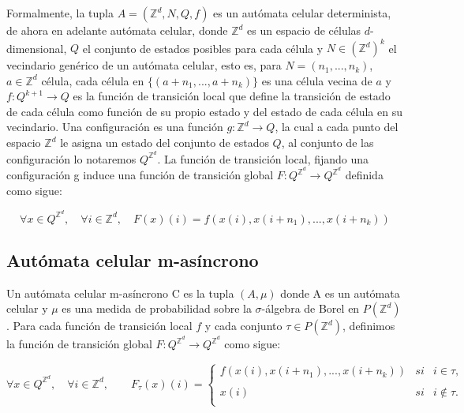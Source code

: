 \documentclass[../proyecto.tex]{memoir}
\begin{document}
Formalmente, la tupla $A=(\mathds{Z}^{d}, N, Q, f)$ es un autómata celular determinista, de ahora en adelante autómata celular, donde $\mathds{Z} ^{d}$ es un espacio de células $d$-dimensional, $Q$ el conjunto de estados posibles para cada célula y $N \in (\mathds{Z}^{d})^{k}$ el vecindario genérico de un autómata celular, esto es, para $N=(n_{1},...,n_{k})$, $a \in \mathds{Z} ^{d}$ célula, cada célula en $\{(a+n_{1},...,a+n_{k})\}$ es una célula vecina de $a$ y $f:Q^{k+1} \rightarrow Q$ es la función de transición local que define la transición de estado de cada célula como función de su propio estado y del estado de cada célula en su vecindario. Una configuración es una función $g: \mathds{Z}^{d} \rightarrow Q$, la cual a cada punto del espacio $\mathds{Z}^{d}$ le asigna un estado del conjunto de estados $Q$, al conjunto de las configuración lo notaremos $Q^{\mathds{Z}^{d}}$. La función de transición local, fijando una configuración g induce una función de transición global $F:Q^{\mathds{Z}^{d}} \rightarrow Q^{\mathds{Z}^{d}}$ definida como sigue:

\begin{equation*}
\forall x \in Q^{\mathds{Z}^{d}}, \quad \forall i \in \mathds{Z}^{d}, \quad F(x)(i) = f(x(i),x(i+n_{1}),...,x(i+n_{k}))
\end{equation*}

\subsection{Autómata celular m-asíncrono}

Un autómata celular m-asíncrono C es la tupla $(A, \mu)$ donde A es un autómata celular y $\mu$ es una medida de probabilidad sobre la $\sigma$-álgebra de Borel en $P(\mathds{Z}^{d})$. 
Para cada función de transición local $f$ y cada conjunto $\tau \in P(\mathds{Z}^{d})$, definimos la función de transición global $F:Q^{\mathds{Z}^{d}} \rightarrow Q^{\mathds{Z}^{d}}$ como sigue:

\begin{equation*}
	\forall x \in Q^{\mathds{Z}^{d}}, \quad \forall i \in \mathds{Z}^{d}, \qquad
	F_{\tau}(x)(i) = \left\{ \begin{array}{lcc}
             f(x(i),x(i+n_{1}),...,x(i+n_{k})) &   si  & i \in \tau ,\\
             \\ x(i) & si  & i \notin \tau .\\
             \end{array}
             \right.
\end{equation*}
\end{document}
